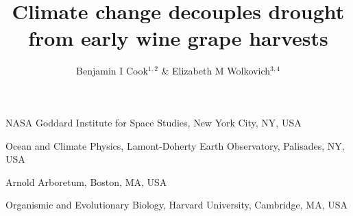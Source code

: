 \documentclass[final]{nature}
\title{Climate change decouples drought from early wine grape harvests}
\author{Benjamin I Cook$^{1,2}$ \& Elizabeth M Wolkovich$^{3,4}$}
\begin{document}
\maketitle

\begin{affiliations}
 \item NASA Goddard Institute for Space Studies, New York City, NY, USA
 \item Ocean and Climate Physics, Lamont-Doherty Earth Observatory, Palisades, NY, USA
 \item Arnold Arboretum, Boston, MA, USA
 \item Organismic and Evolutionary Biology, Harvard University, Cambridge, MA, USA
\end{affiliations}

\begin{abstract}

\end{abstract}
\end{document}
